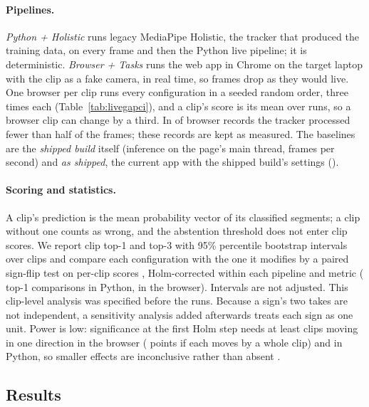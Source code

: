\paragraph{Pipelines.} \emph{Python + Holistic} runs legacy MediaPipe Holistic, the tracker that
produced the training data, on every frame and then the Python live pipeline; it is deterministic.
\emph{Browser + Tasks} runs the web app in Chrome on the target laptop with the clip as a fake
camera, in real time, so frames drop as they would live. One browser per clip runs every
configuration in a seeded random order, three times each (Table~\ref{tab:livegapci}), and a clip's
score is its mean over runs, so a browser clip can change by a third. In  of  browser records the
tracker processed fewer than half of the frames; these records are kept as measured. The baselines
are the \emph{shipped build} itself (inference on the page's main thread, 
frames per second) and \emph{as shipped}, the current app with the shipped build's settings
().

\paragraph{Scoring and statistics.} A clip's prediction is the mean probability vector of its
classified segments; a clip without one counts as wrong, and the abstention threshold does not
enter clip scores. We report clip top-1 and top-3 with 95\% percentile bootstrap intervals over
clips \citep{efron1994bootstrap} and compare each configuration with the one it modifies by a
paired sign-flip test on per-clip scores \citep{dror2018hitchhiker}, Holm-corrected within each
pipeline and metric \citep{dror2017replicability} ( top-1 comparisons in Python,
 in the browser). Intervals are not adjusted. This clip-level analysis was specified before the runs. Because a sign's two takes are
not independent, a sensitivity analysis added afterwards treats each sign as one unit.
Power is low: significance at the first Holm step needs at least  clips moving in
one direction in the browser ( points if each moves by a whole clip) and
 in Python, so
smaller effects are inconclusive rather than absent \citep{card2020power}.

\subsection{Results}
\label{sec:liveresults}

